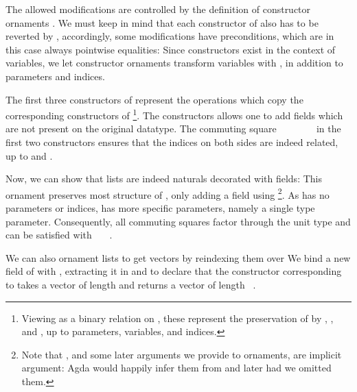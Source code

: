 The allowed modifications are controlled by the definition of constructor ornaments . We must keep in mind that each constructor of  also has to be reverted by , accordingly, some modifications have preconditions, which are in this case always pointwise equalities:
Since constructors exist in the context of variables, we let constructor ornaments transform variables with , in addition to parameters and indices.

The first three constructors of  represent the operations which copy the corresponding constructors of \footnote{Viewing  as a binary relation on , these represent the preservation of  by , , and , up to parameters, variables, and indices.}. The  constructors allows one to add fields which are not present on the original datatype.
The commuting square \ \ \ \ \ \ \  in the first two constructors ensures that the indices on both sides are indeed related, up to  and .

Now, we can show that lists are indeed naturals decorated with fields:
This ornament preserves most structure of \bN{}, only adding a field using \footnote{Note that , and some later arguments we provide to ornaments, are implicit argument: Agda would happily infer them from  and later  had we omitted them.}. As \bN{} has no parameters or indices,  has more specific parameters, namely a single type parameter. Consequently, all commuting squares factor through the unit type and can be satisfied with \ \AV{\_}\ \ . 

We can also ornament lists to get vectors by reindexing them over \bN{}
We bind a new field of \bN{} with , extracting it in  and  to declare that the constructor corresponding to  takes a vector of length  and returns a vector of length \ . 

